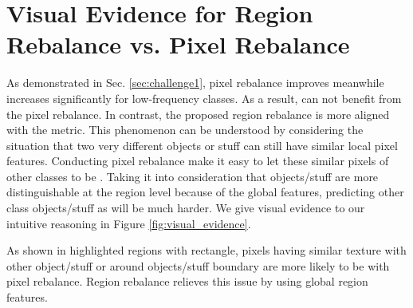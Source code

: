 \documentclass[final]{cvpr}
\begin{document}
\vspace{0.5in}
\section{Visual Evidence for Region Rebalance vs. Pixel Rebalance}
\noindent As demonstrated in Sec. \ref{sec:challenge1}, pixel rebalance improves  meanwhile increases  significantly for low-frequency classes. As a result,  can not benefit from the pixel rebalance. In contrast, the proposed region rebalance is more aligned with the  metric. 
This phenomenon can be understood by considering the situation that two very different objects or stuff can still have similar local pixel features. Conducting pixel rebalance make it easy to let these similar pixels of other classes to be . Taking it into consideration that objects/stuff are more distinguishable at the region level because of the global features, predicting other class objects/stuff as  will be much harder. We give visual evidence to our intuitive reasoning in Figure \ref{fig:visual_evidence}.  


\noindent As shown in highlighted regions with rectangle, pixels having similar texture with other object/stuff or around objects/stuff boundary are more likely to be  with pixel rebalance. Region rebalance relieves this issue by using global region features.
\end{document}
